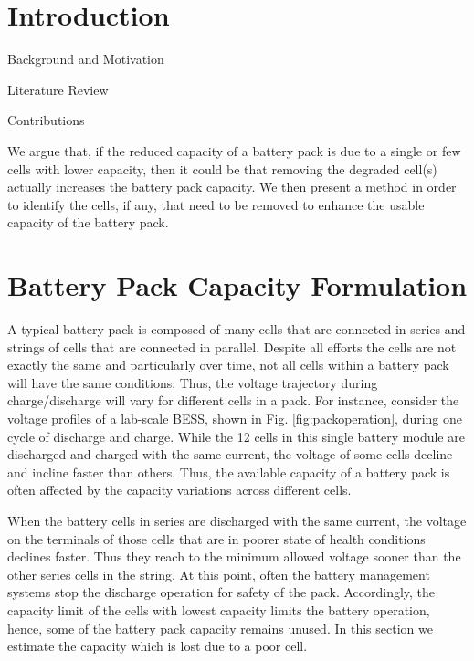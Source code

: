 \documentclass[10pt,twocolumn]{IEEEtran}
\begin{document}
\section{Introduction}

\color{red}
Background and Motivation

Literature Review

Contributions

\color{black}

We  argue that, if the reduced capacity of a battery pack is due to a single or few cells with lower capacity, then it could be that removing the degraded cell(s) actually increases the battery pack capacity. We then present a method in order to identify the cells, if any, that need to be removed to enhance the usable capacity of the battery pack.

\section{Battery Pack Capacity Formulation}

A typical battery pack is composed of many cells that are connected in series and strings of cells that are connected in parallel. 
Despite all efforts the cells are not exactly the same and particularly over time, not all cells within a battery pack will have the same conditions.
Thus, the voltage trajectory during charge/discharge will vary for different cells in a pack.
For instance, consider the voltage profiles of a lab-scale BESS,  shown in Fig. \ref{fig:packoperation}, during one cycle of discharge and charge.
While the 12 cells in this single battery module are discharged and charged with the same current, the voltage of some cells decline and incline faster than others.
Thus, the available capacity of a battery pack is often affected by the capacity variations  across different cells.


When the battery cells in series  are discharged with the same current, the voltage on the terminals of those cells that are in poorer state of health conditions  declines faster.
Thus they reach to the minimum allowed voltage sooner than the other series cells in the  string.
At this point, often the battery management systems stop the discharge operation for safety of the pack.
Accordingly, the capacity limit of the cells with lowest capacity limits the battery operation, hence, some of the battery pack capacity remains unused.
In this section we estimate the capacity which is lost due to a poor cell.
\end{document}

